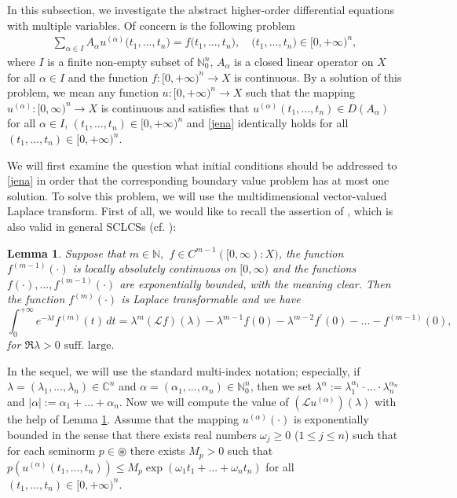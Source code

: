 \documentclass{amsart}
\newtheorem{lem}[thm]{Lemma}
\theoremstyle{definition}
\theoremstyle{remark}
\numberwithin{equation}{section}
\begin{document}
In this subsection, we investigate the abstract higher-order differential equations with multiple variables. Of concern is the following problem
\begin{align}\label{jena}
\sum_{\alpha \in I}A_{\alpha}u^{(\alpha)}\bigl( t_{1},...,t_{n}\bigr)=f\bigl( t_{1},...,t_{n}\bigr),\quad \bigl( t_{1},...,t_{n}\bigr)\in [0,+\infty)^{n},
\end{align}
where $I$ is a finite non-empty subset of ${\mathbb N}_{0}^{n}$, $A_{\alpha}$ is a closed linear operator on $X$ for all $\alpha \in I$ and the function $f : [0,+\infty)^{n} \rightarrow X$ is continuous. By a solution of this problem, we mean any function $u: [0,+\infty)^{n} \rightarrow X$ such that the mapping $u^{(\alpha)}: [0,\infty)^{n} \rightarrow X $ is continuous and satisfies that $u^{(\alpha)} ( t_{1},...,t_{n} )\in D(A_{\alpha})$ for all $\alpha \in I$, $ ( t_{1},...,t_{n} )\in [0,+\infty)^{n} $ and \eqref{jena} identically holds for all $ ( t_{1},...,t_{n} )\in [0,+\infty)^{n} .$

We will first examine the question what initial conditions should be addressed to \eqref{jena} in order that the corresponding boundary value problem has at most one solution. To solve this problem, we will use the multidimensional vector-valued Laplace transform. First of all, we would like to recall the assertion of \cite[Lemma 7.3.1]{funkcionalne}, which is also valid in general SCLCSs (cf. \cite[Theorem 1.1.4(iii)]{FKP}):

\begin{lem}\label{profop}
Suppose that $m\in {\mathbb N},$ $f\in C^{m-1}([0,\infty): X)$, the function $f^{(m-1)}(\cdot)$ is locally absolutely continuous on $[0,\infty)$ and the functions $f(\cdot),...,f^{(m-1)}(\cdot)$ are exponentially bounded, with the meaning clear. Then the function $f^{(m)}(\cdot)$ is Laplace transformable and we have
$$
\int^{+\infty}_{0}e^{-\lambda t}f^{(m)}(t)\, dt=\lambda^{m}({\mathcal L }f)(\lambda)-\lambda^{m-1}f(0)-\lambda^{m-2}f^{\prime}(0)-...-f^{(m-1)}(0),\quad 
$$
for $\Re \lambda>0\mbox{ suff. large.}$
\end{lem}

In the sequel, we will use the standard multi-index notation; especially, if $\lambda=(\lambda_{1},...,\lambda_{n}) \in {\mathbb C}^{n}$ and $\alpha=(\alpha_{1},...,\alpha_{n}) \in {\mathbb N}_{0}^{n}$, then we set $\lambda^{\alpha}:=\lambda_{1}^{\alpha_{1}}\cdot ... \cdot \lambda_{n}^{\alpha_{n}}$ and $|\alpha|:=\alpha_{1}+...+\alpha_{n}.$ 
Now we will compute the value of $({\mathcal L}u^{(\alpha)})(\lambda)$ with the help of Lemma \ref{profop}. Assume that the mapping $u^{(\alpha)}(\cdot)$ is exponentially bounded in the sense that there exists real numbers $\omega_{j}\geq 0$ ($1\leq j\leq n$) such that for each seminorm $p\in \circledast$ there exists $M_{p}>0$ such that $p(u^{(\alpha)}(t_{1},...,t_{n}))\leq M_{p}\exp(\omega_{1}t_{1}+...+\omega_{n}t_{n})$ for all $(t_{1},...,t_{n})\in [0,+\infty)^{n}.$ 
\end{document}
